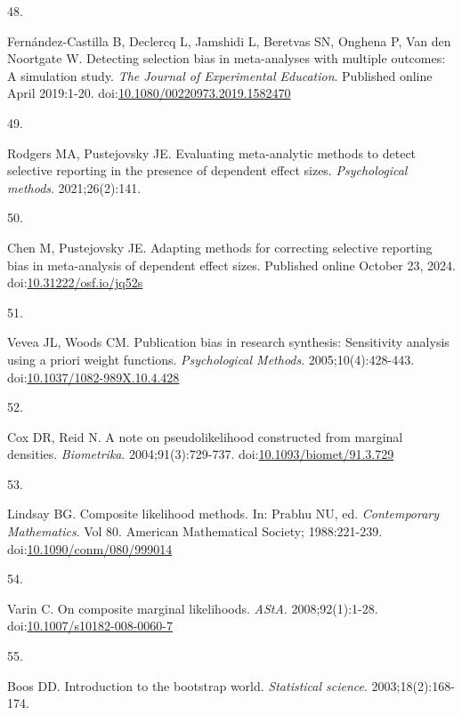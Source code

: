 \documentclass[
  american,
  man, donotrepeattitle,floatsintext]{apa7}
\newlength{\cslhangindent}
\newlength{\csllabelwidth}
\newenvironment{CSLReferences}[2] %
 {\begin{list}{}{%
  \setlength{\itemindent}{0pt}
  \setlength{\leftmargin}{0pt}
  \setlength{\parsep}{0pt}
  \ifodd #1
   \setlength{\leftmargin}{\cslhangindent}
   \setlength{\itemindent}{-1\cslhangindent}
  \fi
  \setlength{\itemsep}{#2\baselineskip}}}
 {\end{list}}
\newcommand{\CSLLeftMargin}[1]{\parbox[t]{\csllabelwidth}{\strut#1\strut}}
\newcommand{\CSLRightInline}[1]{\parbox[t]{\linewidth - \csllabelwidth}{\strut#1\strut}}
\begin{document}
\begin{CSLReferences}{0}{1}
\CSLLeftMargin{48. }%
\CSLRightInline{Fernández-Castilla B, Declercq L, Jamshidi L, Beretvas SN, Onghena P, Van den Noortgate W. Detecting selection bias in meta-analyses with multiple outcomes: A simulation study. \emph{The Journal of Experimental Education}. Published online April 2019:1-20. doi:\href{https://doi.org/10.1080/00220973.2019.1582470}{10.1080/00220973.2019.1582470}}

\CSLLeftMargin{49. }%
\CSLRightInline{Rodgers MA, Pustejovsky JE. Evaluating meta-analytic methods to detect selective reporting in the presence of dependent effect sizes. \emph{Psychological methods}. 2021;26(2):141.}

\CSLLeftMargin{50. }%
\CSLRightInline{Chen M, Pustejovsky JE. Adapting methods for correcting selective reporting bias in meta-analysis of dependent effect sizes. Published online October 23, 2024. doi:\href{https://doi.org/10.31222/osf.io/jq52s}{10.31222/osf.io/jq52s}}

\CSLLeftMargin{51. }%
\CSLRightInline{Vevea JL, Woods CM. Publication bias in research synthesis: Sensitivity analysis using a priori weight functions. \emph{Psychological Methods}. 2005;10(4):428-443. doi:\href{https://doi.org/10.1037/1082-989X.10.4.428}{10.1037/1082-989X.10.4.428}}

\CSLLeftMargin{52. }%
\CSLRightInline{Cox DR, Reid N. A note on pseudolikelihood constructed from marginal densities. \emph{Biometrika}. 2004;91(3):729-737. doi:\href{https://doi.org/10.1093/biomet/91.3.729}{10.1093/biomet/91.3.729}}

\CSLLeftMargin{53. }%
\CSLRightInline{Lindsay BG. Composite likelihood methods. In: Prabhu NU, ed. \emph{Contemporary {Mathematics}}. Vol 80. American Mathematical Society; 1988:221-239. doi:\href{https://doi.org/10.1090/conm/080/999014}{10.1090/conm/080/999014}}

\CSLLeftMargin{54. }%
\CSLRightInline{Varin C. On composite marginal likelihoods. \emph{AStA}. 2008;92(1):1-28. doi:\href{https://doi.org/10.1007/s10182-008-0060-7}{10.1007/s10182-008-0060-7}}

\CSLLeftMargin{55. }%
\CSLRightInline{Boos DD. Introduction to the bootstrap world. \emph{Statistical science}. 2003;18(2):168-174.}


\end{CSLReferences}
\end{document}
